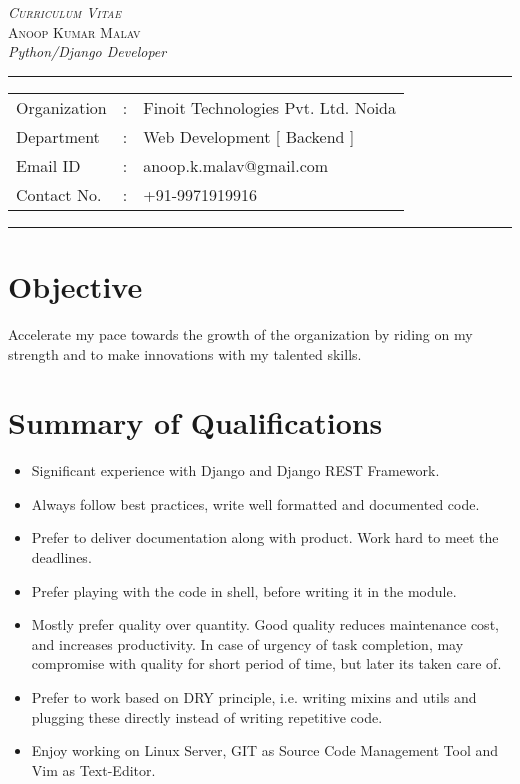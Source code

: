 \documentclass[10pt]{article}
\begin{document}
\begin{center}

\textsc{\huge \textit{Curriculum Vitae}}
\\[0.5cm]
\textsc{\Large Anoop Kumar Malav}
 \\[0.1cm]

\textit{\large Python/Django Developer} \\
\addvspace{0.04cm} 
\rule[0.07cm]{17.52cm}{0.01cm}
\begin{tabular}{l c l}
Organization      &:& Finoit Technologies Pvt. Ltd. Noida \\ 
Department        &:& Web Development [ Backend ] \\
Email ID          &:& anoop.k.malav@gmail.com \\
Contact No.       &:& +91-9971919916 \\
\end{tabular}

\addvspace{0.02cm}
\rule[0.02cm]{17.52cm}{0.01cm}
\end{center}

\section*{Objective}
Accelerate my pace towards the growth of the organization by riding on my strength and
to make innovations with my talented skills.

\section*{Summary of Qualifications}

\begin{itemize}
 \item Significant experience with Django and Django REST Framework.
 \item Always follow best practices, write well formatted and documented code.
 \item Prefer to deliver documentation along with product. Work hard to meet the deadlines.
 \item Prefer playing with the code in shell, before writing it in the module.
 \item Mostly prefer quality over quantity. Good quality reduces maintenance cost, and increases productivity. In case of urgency of task completion, may compromise with quality for short period of time, but later its taken care of.
 \item Prefer to work based on DRY principle, i.e. writing mixins and utils and plugging these directly instead of writing repetitive code.
 \item Enjoy working on Linux Server, GIT as Source Code Management Tool and Vim as Text-Editor.
\end{itemize}
\end{document}
